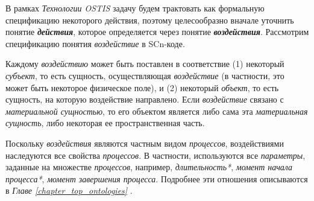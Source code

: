 В рамках \textit{Технологии OSTIS} задачу будем трактовать как формальную спецификацию некоторого действия, поэтому целесообразно вначале уточнить понятие \textbf{\textit{действия}}, которое определяется через понятие \textbf{\textit{воздействия}}. Рассмотрим спецификацию понятия \textit{воздействие} в SCn-коде.

\begin{SCn}
	\begin{scnindent}
	\end{scnindent}

\begin{comment}
	\scnheader{субъект}
	\scnidtf{активная сущность}
	\scnsubset{сущность}
	\scnidtftext{часто используемый sc-идентификатор}{индивид}

	\scnheader{субъект\scnrolesign}
	\scnidtf{воздействующая сущность\scnrolesign}
	\scnidtf{сущность, создающая \textit{причину} изменений другой сущности (объекта)\scnrolesign}

	\scnheader{объект\scnrolesign}
	\scnidtf{воздействуемая сущность\scnrolesign}
	\scnidtf{сущность, являющаяся в рамках заданного воздействия исходным условием (аргументом), необходимым для выполнения этого воздействия\scnrolesign}
\end{comment}
\end{SCn}

Каждому \textit{воздействию} может быть поставлен в соответствие (1) некоторый \textit{субъект\scnrolesign}, то есть сущность, осуществляющая \textit{воздействие} (в частности, это может быть некоторое физическое поле), и (2) некоторый \textit{объект\scnrolesign}, то есть сущность, на которую воздействие направлено. Если \textit{воздействие} связано с \textit{материальной сущностью}, то его объектом является либо сама эта \textit{материальная сущность}, либо некоторая ее пространственная часть.

Поскольку \textit{воздействия} являются частным видом \textit{процессов}, воздействиями наследуются все свойства \textit{процессов}. В частности, используются все \textit{параметры}, заданные на множестве \textit{процессов}, например, \textit{длительность*}, \textit{момент начала процесса*}, \textit{момент завершения процесса\scnsupergroupsign}. Подробнее эти отношения описываются в \textit{Главе \ref{chapter_top_ontologies} }.


